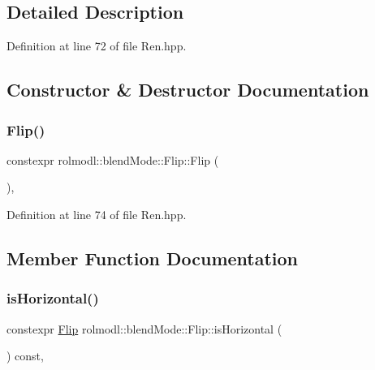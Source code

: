\subsection{Detailed Description}


Definition at line 72 of file Ren.\+hpp.



\subsection{Constructor \& Destructor Documentation}
\mbox{\label{structrolmodl_1_1blend_mode_1_1_flip_a5a509838584014ec45436e2ce79b9c6f}} 
\subsubsection{\texorpdfstring{Flip()}{Flip()}}
{\footnotesize\ttfamily constexpr rolmodl\+::blend\+Mode\+::\+Flip\+::\+Flip (\begin{DoxyParamCaption}{ }\end{DoxyParamCaption})\hspace{0.3cm}{\ttfamily [inline]}, {\ttfamily [noexcept]}}



Definition at line 74 of file Ren.\+hpp.



\subsection{Member Function Documentation}
\mbox{\label{structrolmodl_1_1blend_mode_1_1_flip_a13ce5ea7245c1031865ffb2a39e9eb93}} 
\subsubsection{\texorpdfstring{isHorizontal()}{isHorizontal()}}
{\footnotesize\ttfamily constexpr \mbox{\hyperlink{structrolmodl_1_1blend_mode_1_1_flip}{Flip}} rolmodl\+::blend\+Mode\+::\+Flip\+::is\+Horizontal (\begin{DoxyParamCaption}{ }\end{DoxyParamCaption}) const\hspace{0.3cm}{\ttfamily [inline]}, {\ttfamily [noexcept]}}



